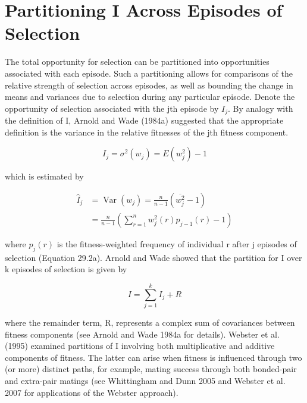 \documentclass{article}
\begin{document}
\section{Partitioning I Across Episodes of Selection}
The total opportunity for selection can be partitioned into opportunities associated with each episode. Such a partitioning allows for comparisons of the relative strength of selection across episodes, as well as bounding the change in means and variances due to selection during any particular episode. Denote the opportunity of selection associated with the jth episode by  $ I_{j} $. By analogy with the definition of I, Arnold and Wade (1984a) suggested that the appropriate definition is the variance in the relative fitnesses of the jth fitness component.

\begin{equation}
I_{j}=\sigma^{2}\left(w_{j}\right)=E(w_{j}^{2})-1
\tag{29.7a}
\label{eq:29_7a}
\end{equation}

which is estimated by

\begin{equation}
\begin{aligned}\widehat{I}_{j}&=\operatorname{Var}(w_{j})=\frac{n}{n-1}\left(\overline{w_{j}^{2}}-1\right)\\&=\frac{n}{n-1}\left(\sum_{r=1}^{n}w_{j}^{2}(r)p_{j-1}(r)-1\right)\end{aligned}
\tag{29.7b}
\label{eq:29_7b}
\end{equation}

where  $ p_{j}(r) $ is the fitness-weighted frequency of individual r after j episodes of selection (Equation 29.2a). Arnold and Wade showed that the partition for I over k episodes of selection is given by

\begin{equation}
I=\sum_{j=1}^{k}I_{j}+R
\tag{29.8}
\label{eq:29_8}
\end{equation}

where the remainder term, R, represents a complex sum of covariances between fitness components (see Arnold and Wade 1984a for details). Webster et al. (1995) examined partitions of I involving both multiplicative and additive components of fitness. The latter can arise when fitness is influenced through two (or more) distinct paths, for example, mating success through both bonded-pair and extra-pair matings (see Whittingham and Dunn 2005 and Webster et al. 2007 for applications of the Webster approach).
\end{document}
